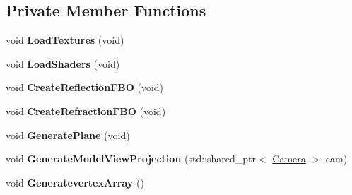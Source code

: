 \subsection*{Private Member Functions}
\begin{DoxyCompactItemize}
\item 
void {\bfseries Load\+Textures} (void)\hypertarget{class_water_a73932f8bc1f58de4e8e3d4a5c2d2c942}{}\label{class_water_a73932f8bc1f58de4e8e3d4a5c2d2c942}

\item 
void {\bfseries Load\+Shaders} (void)\hypertarget{class_water_a8c5658c976177c3f89c95475bb3a3b50}{}\label{class_water_a8c5658c976177c3f89c95475bb3a3b50}

\item 
void {\bfseries Create\+Reflection\+F\+BO} (void)\hypertarget{class_water_a6e828d373d006019f8888d818c87b6ba}{}\label{class_water_a6e828d373d006019f8888d818c87b6ba}

\item 
void {\bfseries Create\+Refraction\+F\+BO} (void)\hypertarget{class_water_a3cf1603740680af4c330199cc62512d7}{}\label{class_water_a3cf1603740680af4c330199cc62512d7}

\item 
void {\bfseries Generate\+Plane} (void)\hypertarget{class_water_ac7a0243b5a7a83e5ca4a61ebb58b7457}{}\label{class_water_ac7a0243b5a7a83e5ca4a61ebb58b7457}

\item 
void {\bfseries Generate\+Model\+View\+Projection} (std\+::shared\+\_\+ptr$<$ \hyperlink{class_camera}{Camera} $>$ cam)\hypertarget{class_water_a245bbdbe2b5467361d57daee8fb1b933}{}\label{class_water_a245bbdbe2b5467361d57daee8fb1b933}

\item 
void {\bfseries Generatevertex\+Array} ()\hypertarget{class_water_abb05d0aff9758b52436f8e7e363fbb32}{}\label{class_water_abb05d0aff9758b52436f8e7e363fbb32}

\end{DoxyCompactItemize}
